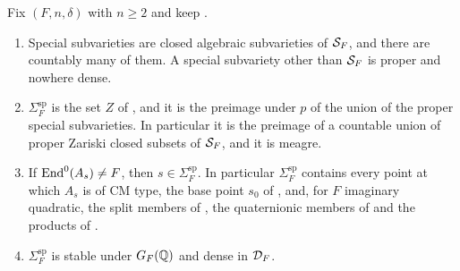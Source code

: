 \begin{proposition}\label{prop:speciallocus}
Fix $(F,n,\delta)$ with $n\ge2$ and keep .
\begin{enumerate}[label=\textup{(\roman*)},leftmargin=2.6em,itemsep=2pt]
\item Special subvarieties are closed algebraic subvarieties of $\mathcal{S}_{F}$, and
  there are countably many of them. A special subvariety other than
  $\mathcal{S}_{F}$ is proper and nowhere dense.
\item $\Sigma^{\mathrm{sp}}_{F}$ is the set $Z$ of , and
  it is the preimage under $p$ of the union of the proper special
  subvarieties. In particular it is the preimage of a countable union of
  proper Zariski closed subsets of $\mathcal{S}_{F}$, and it is meagre.
\item If $\operatorname{End}^{0}(A_{s})\ne F$, then $s\in\Sigma^{\mathrm{sp}}_{F}$. In
  particular $\Sigma^{\mathrm{sp}}_{F}$ contains every point at which $A_{s}$
  is of CM type, the base point $s_{0}$ of , and, for
  $F$ imaginary quadratic, the split members of , the
  quaternionic members of  and the products of
  .
\item $\Sigma^{\mathrm{sp}}_{F}$ is stable under $G_{F}(\mathbb{Q})$ and dense in
  $\mathcal{D}_{F}$.
\end{enumerate}
\end{proposition}

